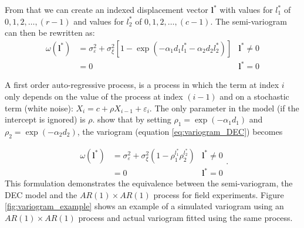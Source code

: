 From that we can create an indexed displacement vector $\mathbf{l}^{*}$ with values for $l_1^*$ of $0,1,2,\ldots,(r-1)$ and values for $l_2^*$ of $0,1,2,\ldots,(c-1)$.
The semi-variogram can then be rewritten as:
\begin{equation}
    \begin{aligned}
        \omega\left(\mathbf{l}^{*}\right) & = \sigma_{\varepsilon}^{2}+\sigma_{\xi}^{2}\left[1-\exp \left(-\alpha_{1} d_{1} 
        l_{1}^{*} - \alpha_{2} d_{2} l_{2}^{*} \right) \right] 
        &  \mathbf{l}^* \neq 0 \\
        & = 0
        & \mathbf{l}^* = 0 
    \end{aligned}
    \label{eq:variogram_DEC}
\end{equation}

A first order auto-regressive process, is a process in which the term at index $i$ only depends on the value of the process at index $(i-1)$ and on a stochastic term (white noise): $X_{i} = c + \rho X_{i-1} + \varepsilon_{i}$. 
The only parameter in the model (if the intercept is ignored) is $\rho$. \textcite{cullis_spatial_1991,cressie_statistics_1992} show that by setting $\rho_1 = \operatorname{exp}(-\alpha_{1}d_{1})$ and $\rho_{2} = \operatorname{exp}(-\alpha_{2}d_{2})$, the variogram (equation \ref{eq:variogram_DEC}) becomes

\begin{equation}
    \begin{aligned}
        \omega\left(\mathbf{l}^{*}\right)
        & = \sigma_{\varepsilon}^{2}+\sigma_{\xi}^{2}\left(1-\rho_{1}^{l_{1}^{*}} \rho_{2}^{l_{2}^{*}}\right) 
        & \mathbf{l}^* \neq 0 \\
        & = 0
        & \mathbf{l}^* = 0 
    \end{aligned}
	\text{.}    
\end{equation}
This formulation demonstrates the equivalence between the semi-variogram, the DEC model and the $AR(1) \times AR(1)$ process for field experiments. Figure \ref{fig:variogram_example} shows an example of a simulated variogram using an $AR(1) \times AR(1)$ process and actual variogram fitted using the same process.

